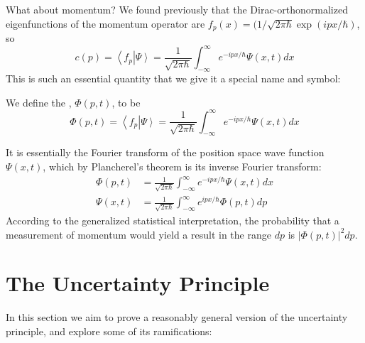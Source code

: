 \documentclass[12pt, a4paper, oneside, openright, titlepage]{book}
\newcommand{\braket}[2]{\left\langle#1\right\vert\left.#2\right\rangle}
\begin{document}
What about momentum? We found previously that the Dirac-orthonormalized eigenfunctions of the momentum operator are $f_p(x) = (1/\sqrt{2\pi \hbar}\exp(ipx/\hbar)$, so $$c(p) = \braket{f_p}{\Psi} = \frac{1}{\sqrt{2\pi\hbar}} \int_{-\infty}^{\infty}e^{-ipx/\hbar}\Psi(x,t)dx$$
This is such an essential quantity that we give it a special name and symbol:

\begin{defn}
    We define the , $\Phi(p,t)$, to be \begin{equation*}
        \Phi(p,t) = \braket{f_p}{\Psi} = \frac{1}{\sqrt{2\pi \hbar}} \int_{-\infty}^{\infty}e^{-ipx/\hbar}\Psi(x,t)dx
    \end{equation*}
\end{defn}
It is essentially the Fourier transform of the position space wave function $\Psi(x,t)$, which by Plancherel's theorem is its inverse Fourier transform: \begin{align*}
    \Phi(p,t) &= \frac{1}{\sqrt{2\pi\hbar}} \int_{-\infty}^{\infty}e^{-ipx/\hbar}\Psi(x,t)dx \\
    \Psi(x,t) &= \frac{1}{\sqrt{2\pi\hbar}}\int_{-\infty}^{\infty}e^{ipx/\hbar}\Phi(p,t)dp
\end{align*}
According to the generalized statistical interpretation, the probability that a measurement of momentum would yield a result in the range $dp$ is $|\Phi(p,t)|^2dp$.


\section{The Uncertainty Principle}

In this section we aim to prove a reasonably general version of the uncertainty principle, and explore some of its ramifications:
\end{document}
